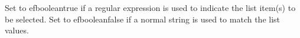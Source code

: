     Set to \app{}efbooleantrue if a regular expression is used to
  indicate the list item(s) to be selected. Set to \app{}efbooleanfalse
  if a normal string is used to match the list values.
